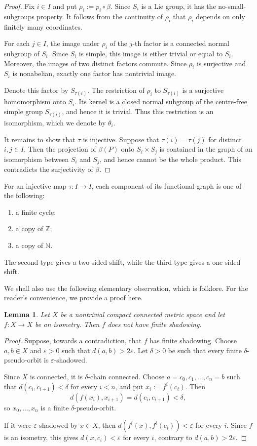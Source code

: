 \documentclass[12pt]{amsart}
\newtheorem{lemma}[theorem]{Lemma}
\theoremstyle{definition}
\numberwithin{equation}{section}
\theoremstyle{remark}
\begin{document}
\begin{proof}
Fix $i\in I$ and put $\rho_i:=p_i\circ\beta$. Since $S_i$ is a Lie
group, it has the no-small-subgroups property. It follows from the
continuity of $\rho_i$ that $\rho_i$ depends on only finitely many
coordinates.

For each $j\in I$, the image under $\rho_i$ of the $j$-th factor is a
connected normal subgroup of $S_i$. Since $S_i$ is simple, this image
is either trivial or equal to $S_i$. Moreover, the images of two
distinct factors commute. Since $\rho_i$ is surjective and $S_i$ is
nonabelian, exactly one factor has nontrivial image.

Denote this factor by $S_{\tau(i)}$. The restriction of $\rho_i$ to
$S_{\tau(i)}$ is a surjective homomorphism onto $S_i$. Its kernel is
a closed normal subgroup of the centre-free simple group
$S_{\tau(i)}$, and hence it is trivial. Thus this restriction is an
isomorphism, which we denote by $\theta_i$.

It remains to show that $\tau$ is injective. Suppose that
$\tau(i)=\tau(j)$ for distinct $i,j\in I$. Then the projection of
$\beta(P)$ onto $S_i\times S_j$ is contained in the graph of an
isomorphism between $S_i$ and $S_j$, and hence cannot be the whole
product. This contradicts the surjectivity of $\beta$.
\end{proof}

For an injective map $\tau:I\to I$, each component of its functional
graph is one of the following:
\begin{enumerate}
\item a finite cycle;
\item a copy of $\mathbb Z$;
\item a copy of $\mathbb N$.
\end{enumerate}
The second type gives a two-sided shift, while the third type gives a
one-sided shift.

We shall also use the following elementary observation, which is folklore. For the reader's convenience, we provide a proof here.

\begin{lemma}\label{lem:iso-no-shad}
Let $X$ be a nontrivial compact connected metric space and let
$f:X\to X$ be an isometry. Then $f$ does not have finite shadowing.
\end{lemma}

\begin{proof}
	Suppose, towards a contradiction, that $f$ has finite shadowing.
	Choose $a,b\in X$ and $\varepsilon>0$ such that
	$d(a,b)>2\varepsilon$. Let $\delta>0$ be such that every finite
	$\delta$-pseudo-orbit is $\varepsilon$-shadowed.

Since $X$ is connected, it is $\delta$-chain connected. Choose
$a=c_0,c_1,\ldots,c_n=b$ such that
$d(c_i,c_{i+1})<\delta$ for every $i<n$, and put
$x_i:=f^i(c_i)$. Then
\[
d(f(x_i),x_{i+1})=d(c_i,c_{i+1})<\delta,
\]
so $x_0,\ldots,x_n$ is a finite $\delta$-pseudo-orbit.

If it were $\varepsilon$-shadowed by $x\in X$, then
$d(f^i(x),f^i(c_i))<\varepsilon$ for every $i$. Since $f$ is an
isometry, this gives $d(x,c_i)<\varepsilon$ for every $i$, contrary
to $d(a,b)>2\varepsilon$.
\end{proof}
\end{document}
